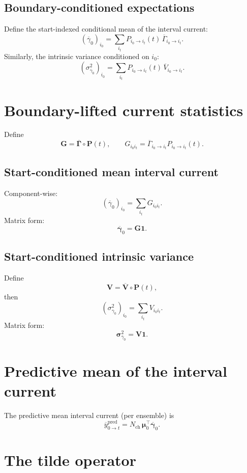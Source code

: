 \documentclass[11pt]{article}
\begin{document}
\subsection{Boundary-conditioned expectations}

Define the start-indexed conditional mean of the interval current:
\[
  (\overline{\gamma}_0)_{i_0}
  =
  \sum_{i_t} P_{i_0 \to i_t}(t)\,\overline{\Gamma}_{i_0 \to i_t}.
\]
Similarly, the intrinsic variance conditioned on \(i_0\):
\[
  (\sigma^2_{\overline{\gamma}_0})_{i_0}
  =
  \sum_{i_t} P_{i_0 \to i_t}(t)\,\overline{V}_{i_0 \to i_t}.
\]

\section{Boundary-lifted current statistics}

Define
\[
  \mathbf{G}
  =
  \overline{\mathbf{\Gamma}} \circ \mathbf{P}(t),\qquad
  G_{i_0 i_t}
  =
  \overline{\Gamma}_{i_0\to i_t} P_{i_0\to i_t}(t).
\]

\subsection{Start-conditioned mean interval current}

Component-wise:
\[
  (\overline{\gamma}_0)_{i_0}
  =
  \sum_{i_t} G_{i_0 i_t}.
\]
Matrix form:
\[
  \overline{\boldsymbol{\gamma}}_0 = \mathbf{G}\mathbf{1}.
\]

\subsection{Start-conditioned intrinsic variance}

Define
\[
  \mathbf{V}=\overline{\mathbf{V}}\circ\mathbf{P}(t),
\]
then
\[
  (\sigma^2_{\overline{\gamma}_0})_{i_0}
  =
  \sum_{i_t} V_{i_0 i_t}.
\]
Matrix form:
\[
  \boldsymbol{\sigma}^2_{\overline{\gamma}_0} = \mathbf{V}\mathbf{1}.
\]

\section{Predictive mean of the interval current}

The predictive mean interval current (per ensemble) is
\[
  \boxed{
    \overline{y}^{\text{pred}}_{0\to t}
    =
    N_{\text{ch}}\,
    \boldsymbol{\mu}_0^\top \overline{\boldsymbol{\gamma}}_0
  }.
\]

\section{The tilde operator}
\end{document}

